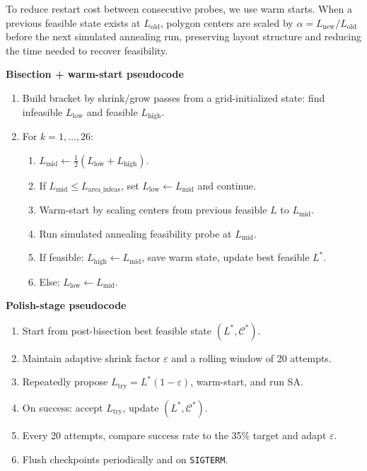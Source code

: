 \documentclass[10pt]{article}
\begin{document}
To reduce restart cost between consecutive probes, we use warm starts.
When a previous feasible state exists at $L_{\mathrm{old}}$, polygon centers are scaled by
$\alpha = L_{\mathrm{new}}/L_{\mathrm{old}}$ before the next simulated annealing run, preserving layout structure
and reducing the time needed to recover feasibility.

\textbf{Bisection + warm-start pseudocode}
\begin{enumerate}[leftmargin=1.2em]
  \item Build bracket by shrink/grow passes from a grid-initialized state:
    find infeasible $L_{\mathrm{low}}$ and feasible $L_{\mathrm{high}}$.
  \item For $k=1,\dots,26$:
    \begin{enumerate}[leftmargin=1.4em]
      \item $L_{\mathrm{mid}} \leftarrow \tfrac{1}{2}(L_{\mathrm{low}} + L_{\mathrm{high}})$.
      \item If $L_{\mathrm{mid}} \le L_{\mathrm{area\_infeas}}$, set
        $L_{\mathrm{low}} \leftarrow L_{\mathrm{mid}}$ and continue.
      \item Warm-start by scaling centers from previous feasible $L$ to $L_{\mathrm{mid}}$.
      \item Run simulated annealing feasibility probe at $L_{\mathrm{mid}}$.
      \item If feasible:
        $L_{\mathrm{high}} \leftarrow L_{\mathrm{mid}}$,
        save warm state,
        update best feasible $L^*$.
      \item Else:
        $L_{\mathrm{low}} \leftarrow L_{\mathrm{mid}}$.
    \end{enumerate}
\end{enumerate}


\textbf{Polish-stage pseudocode}
\begin{enumerate}[leftmargin=1.2em]
  \item Start from post-bisection best feasible state $(L^*,\mathcal{C}^*)$.
  \item Maintain adaptive shrink factor $\varepsilon$ and a rolling window of 20 attempts.
  \item Repeatedly propose $L_{\mathrm{try}}=L^*(1-\varepsilon)$, warm-start, and run SA.
  \item On success: accept $L_{\mathrm{try}}$, update $(L^*,\mathcal{C}^*)$.
  \item Every 20 attempts, compare success rate to the 35\% target and adapt $\varepsilon$.
  \item Flush checkpoints periodically and on \texttt{SIGTERM}.
\end{enumerate}
\end{document}
